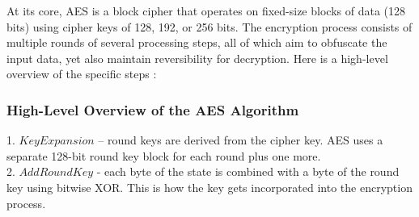 At its core, AES is a block cipher that operates on fixed-size blocks of data (128 bits) using cipher keys of 128, 192, or 256 bits. The encryption process consists of multiple rounds of several processing steps, all of which aim to obfuscate the input data, yet also maintain reversibility for decryption. Here is a high-level overview of the specific steps \cite{Wikipedia_AES_2024}:

\subsubsection{High-Level Overview of the AES Algorithm}
1. $KeyExpansion$ – round keys are derived from the cipher key. AES uses a separate 128-bit round key block for each round plus one more. \\
2. $AddRoundKey$ - each byte of the state is combined with a byte of the round key using bitwise XOR. This is how the key gets incorporated into the encryption process.

